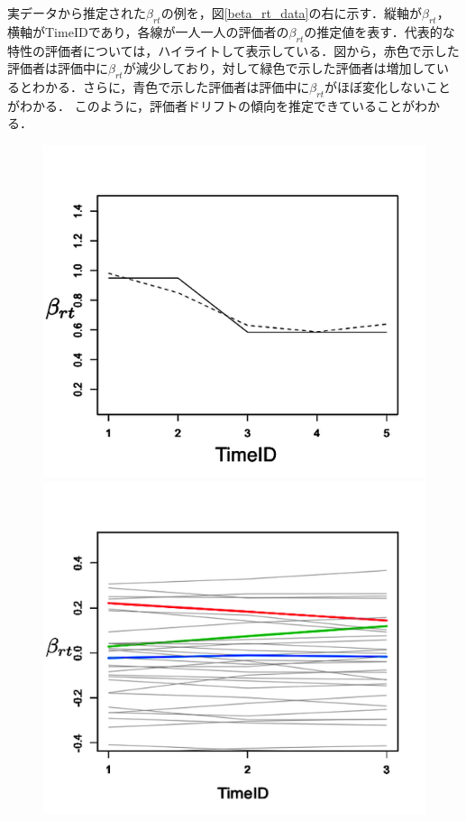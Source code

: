 \documentclass[dvipdfmx, twocolumn, a4paper]{hcresume}
\begin{document}
実データから推定された$\beta_{rt}$の例を，図\ref{beta_rt_data}の右に示す．縦軸が$\beta_{rt}$，横軸がTimeIDであり，各線が一人一人の評価者の$\beta_{rt}$の推定値を表す．代表的な特性の評価者については，ハイライトして表示している．図から，赤色で示した評価者は評価中に$\beta_{rt}$が減少しており，対して緑色で示した評価者は増加しているとわかる．さらに，青色で示した評価者は評価中に$\beta_{rt}$がほぼ変化しないことがわかる．
このように，評価者ドリフトの傾向を推定できていることがわかる．
\begin{figure}[t]
  \begin{minipage}[b]{4cm}
    \includegraphics[keepaspectratio, scale=0.22]{img/beta_rt_param.png}
  \end{minipage}
  \begin{minipage}[b]{4cm}
    \includegraphics[keepaspectratio, scale=0.22]{img/beta_rt_data.png}

\end{minipage}
\end{figure}
\end{document}
